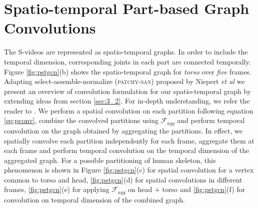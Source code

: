 \documentclass{bmvc2k}
\def\etal{\emph{et al}\bmvaOneDot}
\begin{document}
\section{Spatio-temporal Part-based Graph Convolutions}
\label{sec:stmodel}
The S-videos are represented as spatio-temporal graphs. In order to include the temporal dimension, corresponding joints in each part are connected temporally. Figure \ref{fig:pstgcn}(b) shows the spatio-temporal graph for \textit{torso} over \textit{five} frames. Adapting select-assemble-normalize (\textsc{patchy-san}) proposed by Niepert \etal \cite{niepert2016learning} we present an overview of convolution formulation for our spatio-temporal graph by extending ideas from section \ref{sec:3_2}. For in-depth understanding, we refer the reader to \cite{niepert2016learning}. We perform a spatial convolution on each partition following equation \ref{eq:pconv}, combine the convolved partitions using $\mathcal{F}_{agg}$ and perform temporal convolution on the graph obtained by aggregating the partitions. In effect, we spatially convolve each partition independently for each frame, aggregate them at each frame and perform temporal convolution on the temporal dimension of the aggregated graph. For a possible partitioning of human skeleton, this phenomenon is shown in Figure \ref{fig:pstgcn}(c) for spatial convolution for a vertex common to torso and head, \ref{fig:pstgcn}(d) for spatial convolutions in different frames, \ref{fig:pstgcn}(e) for applying $\mathcal{F}_{agg}$ on head + torso and \ref{fig:pstgcn}(f) for convolution on temporal dimension of the combined graph.
\end{document}
